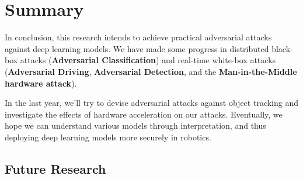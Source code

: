 \chapter{Summary}

In conclusion, this research intends to achieve practical adversarial attacks against deep learning models. We have made some progress in distributed black-box attacks (\textbf{Adversarial Classification}) and real-time white-box attacks (\textbf{Adversarial Driving}, \textbf{Adversarial Detection}, and the \textbf{Man-in-the-Middle hardware attack}).

In the last year, we'll try to devise adversarial attacks against object tracking and investigate the effects of hardware acceleration on our attacks. Eventually, we hope we can understand various models through interpretation, and thus deploying deep learning models more securely in robotics.

\section{Future Research}
